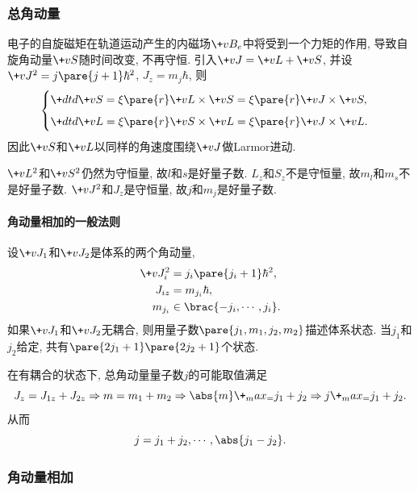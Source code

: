 \documentclass[hidelinks]{ctexart}
\begin{document}


\subsubsection{总角动量} %
\label{ssub:总角动量}

电子的自旋磁矩在轨道运动产生的内磁场$\+vB_e$中将受到一个力矩的作用, 导致自旋角动量$\+vS$随时间改变, 不再守恒. 引入$\+vJ = \+vL+\+vS$, 并设$\+vJ^2 = j\pare{j+1}\hbar^2$, $J_z = m_j \hbar$, 则
\[ \begin{cases}
    \displaystyle \+dtd{\+vS} = \xi\pare{r} \+vL\times \+vS = \xi\pare{r} \+vJ\times \+vS, \\[.5em]
    \displaystyle \+dtd{\+vL} = \xi\pare{r}\+vS\times \+vL = \xi\pare{r} \+vJ\times \+vL.
\end{cases} \]
因此$\+vS$和$\+vL$以同样的角速度围绕$\+vJ$做Larmor进动.
\par
$\+vL^2$和$\+vS^2$仍然为守恒量, 故$l$和$s$是好量子数. $L_z$和$S_z$不是守恒量, 故$m_l$和$m_s$不是好量子数. $\+vJ^2$和$J_z$是守恒量, 故$j$和$m_j$是好量子数.

\paragraph{角动量相加的一般法则} %
\label{par:角动量相加的一般法则}

设$\+vJ_1$和$\+vJ_2$是体系的两个角动量,
\begin{align*}
    \+vJ_i^2 &= j_i\pare{j_i + 1}\hbar^2,\\
    J_{iz} &= m_{j_i} \hbar,\\
    m_{j_i} &\in \brac{-j_i,\cdots,j_i}.
\end{align*}
如果$\+vJ_1$和$\+vJ_2$无耦合, 则用量子数$\pare{j_1,m_1,j_2,m_2}$描述体系状态. 当$j_1$和$j_2$给定, 共有$\pare{2j_1+1}\pare{2j_2+1}$个状态.
\par
在有耦合的状态下, 总角动量量子数$j$的可能取值满足
\[ J_z = J_{1z} + J_{2z} \Rightarrow m = m_1 + m_2 \Rightarrow \abs{m}\+_max_ = j_1 + j_2 \Rightarrow j\+_max_ = j_1 + j_2. \]
从而
\[ j = j_1+j_2,\cdots, \abs{j_1 - j_2}. \]



\subsubsection{角动量相加} %
\label{ssub:角动量相加}
\end{document}
